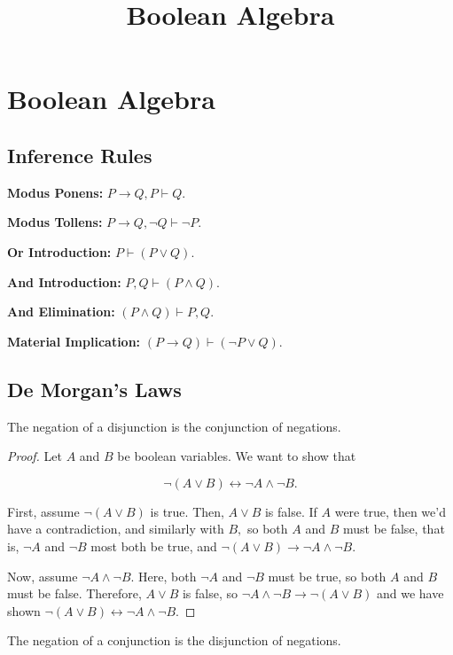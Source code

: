 \documentclass{article}
\title{Boolean Algebra}
\begin{document}
\section{Boolean Algebra}

\subsection{Inference Rules}

\textbf{Modus Ponens:} $ P \rightarrow Q, P \vdash Q. $

\textbf{Modus Tollens:} $ P \rightarrow Q, \neg Q \vdash \neg P. $

\textbf{Or Introduction:} $ P \vdash (P \lor Q). $

\textbf{And Introduction:} $ P, Q \vdash (P \land Q). $

\textbf{And Elimination:} $ (P \land Q) \vdash P, Q. $

\textbf{Material Implication:} $(P \rightarrow Q) \vdash (\neg P \lor Q). $

\subsection{De Morgan's Laws}

\begin{theorem}\label{negation-of-disjunction-is-conjunction-of-negations}
The negation of a disjunction is the conjunction of negations.
\end{theorem}

\begin{proof}
Let $A$ and $B$ be boolean variables. We want to show that 

\[ \neg (A \lor B) \leftrightarrow \neg A \land \neg B. \]

First, assume $\neg (A \lor B)$ is true. Then, $A \lor B$ is false. If $A$ were true, then we'd have a contradiction, and similarly with $B,$ so both $A$ and $B$ must be false, that is, $\neg A$ and $\neg B$ most both be true, and $\neg (A \lor B) \rightarrow \neg A \land \neg B.$

Now, assume $\neg A \land \neg B.$ Here, both $\neg A$ and $\neg B$ must be true, so both $A$ and $B$ must be false. Therefore, $A \lor B$ is false, so $\neg A \land \neg B \rightarrow \neg (A \lor B)$ and we have shown $\neg (A \lor B) \leftrightarrow \neg A \land \neg B.$
\end{proof}

\begin{theorem}\label{negation-of-conjunction-is-disjunction-of-negations}
The negation of a conjunction is the disjunction of negations.
\end{theorem}
\end{document}
